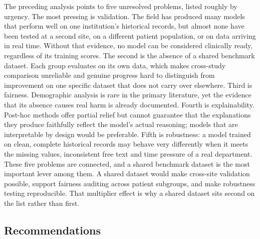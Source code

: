 \documentclass[11pt]{article}
\begin{document}
The preceding analysis points to five unresolved problems, listed roughly by urgency. The most pressing is validation. The field has produced many models that perform well on one institution's historical records, but almost none have been tested at a second site, on a different patient population, or on data arriving in real time. Without that evidence, no model can be considered clinically ready, regardless of its training scores. The second is the absence of a shared benchmark dataset. Each group evaluates on its own data, which makes cross-study comparison unreliable and genuine progress hard to distinguish from improvement on one specific dataset that does not carry over elsewhere. Third is fairness. Demographic analysis is rare in the primary literature, yet the evidence that its absence causes real harm is already documented. Fourth is explainability. Post-hoc methods offer partial relief but cannot guarantee that the explanations they produce faithfully reflect the model's actual reasoning; models that are interpretable by design would be preferable. Fifth is robustness: a model trained on clean, complete historical records may behave very differently when it meets the missing values, inconsistent free text and time pressure of a real department. These five problems are connected, and a shared benchmark dataset is the most important lever among them. A shared dataset would make cross-site validation possible, support fairness auditing across patient subgroups, and make robustness testing reproducible. That multiplier effect is why a shared dataset sits second on the list rather than first.

\subsection{Recommendations}
\label{sec:recommendations}
\end{document}
